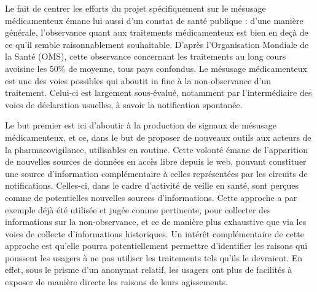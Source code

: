 \documentclass[a4paper, 12pt, openany, oneside, abstract=on]{article} %
\begin{document}
Le fait de centrer les efforts du projet spécifiquement sur le mésusage médicamenteux émane lui aussi d'un constat de santé publique : d'une manière générale, l'observance quant aux traitements médicamenteux est bien en deçà de ce qu'il semble raisonnablement souhaitable. D'après l'Organisation Mondiale de la Santé (OMS), cette observance concernant les traitements au long cours avoisine les 50\% de moyenne, tous pays confondus\cite{WorldHealthOrganizationWHO2015}. Le mésusage médicamenteux est une des voies possibles qui aboutit in fine à la non-observance d'un traitement. Celui-ci est largement sous-évalué\cite{Huang2014,Margraff2014}, notamment par l'intermédiaire des voies de déclaration usuelles, à savoir la notification spontanée\cite{Faillie2016}.\label{signalisation}

Le but premier est ici d'aboutir à la production de signaux de mésusage médicamenteux, et ce, dans le but de proposer de nouveaux outils aux acteurs de la pharmacovigilance, utilisables en routine. Cette volonté émane de l'apparition de nouvelles sources de données en accès libre depuis le web, pouvant constituer une source d'information complémentaire à celles représentées par les circuits de notifications. Celles-ci, dans le cadre d'activité de veille en santé, sont perçues comme de potentielles nouvelles sources d'informations\cite{RavoireSophie2017,Sarker2015,Charles-Smith2015}. Cette approche a par exemple déjà été utilisée et jugée comme pertinente, pour collecter des informations sur la non-observance, et ce de manière plus exhaustive que via les voies de collecte d'informations historiques\cite{Xie2017,Iniacio2017}. Un intérêt complémentaire de cette approche est qu'elle pourra potentiellement permettre d'identifier les raisons qui poussent les usagers à ne pas utiliser les traitements tels qu'ils le devraient. En effet, sous le prisme d'un anonymat relatif, les usagers ont plus de facilités à exposer de manière directe les raisons de leurs agissements.
\end{document}

